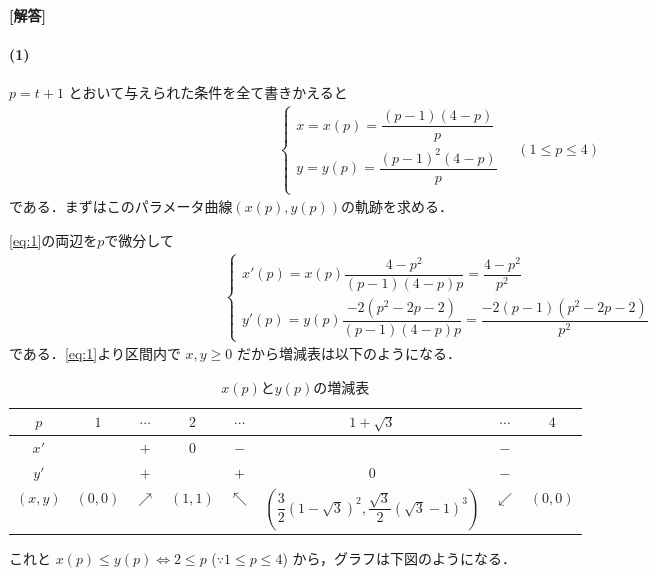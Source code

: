\documentclass[../../main.tex]{subfiles}
\begin{document}
\begin{oframed}
  
\end{oframed}

{\bf [解答]}

\paragraph{(1)}

$p = t+1$ とおいて与えられた条件を全て書きかえると
\begin{align}
  \begin{cases}
    x = x(p) = \dfrac{(p-1)(4-p)}{p} \\
    y = y(p) = \dfrac{(p-1)^2(4-p)}{p} \\
  \end{cases} \quad (1 \le p \le 4) \label{eq:1}
\end{align}
である．まずはこのパラメータ曲線$(x(p),y(p))$の軌跡を求める．

\cref{eq:1}の両辺を$p$で微分して
\begin{align}
  \begin{cases}
    x'(p) = x(p) \dfrac{4-p^2}{(p-1)(4-p)p} = \dfrac{4-p^2}{p^2} \\
    y'(p) = y(p) \dfrac{-2(p^2-2p-2)}{(p-1)(4-p)p} = \dfrac{-2(p-1)(p^2-2p-2)}{p^2}
  \end{cases}
\end{align}
である．\cref{eq:1}より区間内で $x, y \ge 0$ だから増減表は以下のようになる．

\begin{table}[htb]
  \centering
  \caption{$x(p)$と$y(p)$の増減表}
  \begin{tabular}{|c|c|c|c|c|c|c|c|}
    \hline
    $p$ & $1$ & $\cdots$ & $2$ & $\cdots$ & $1+\sqrt{3}$ & $\cdots$ & $4$ \\
    \hline
    $x'$ & & $+$ & $0$ & $-$ & & $-$ & \\
    \hline
    $y'$ & & $+$ & & $+$ & $0$ & $-$ & \\
    \hline
    $(x, y)$ & $(0, 0)$ & $\nearrow$ & $(1, 1)$ & $\nwarrow$ & $(\dfrac{3}{2}(1-\sqrt{3})^2, \dfrac{\sqrt{3}}{2}(\sqrt{3}-1)^3)$ & $\swarrow$ & $(0, 0)$ \\
    \hline
  \end{tabular}
\end{table}

これと $x(p) \le y(p) \iff 2 \le p$ ($\because 1 \le p \le 4$) から，グラフは下図のようになる．
\end{document}
